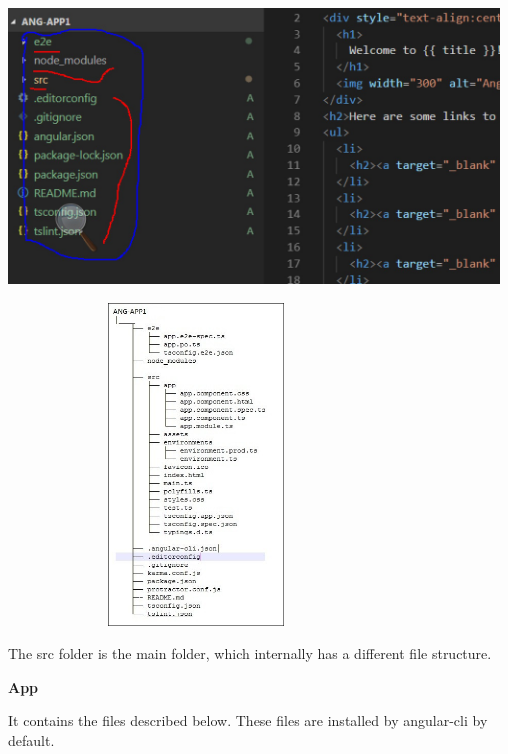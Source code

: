\documentclass{article}
\begin{document}
\begin{center}
	\noindent \includegraphics*[width=5.12in, height=2.88in]{IMG-01-34}
\end{center}
\begin{center}
	\noindent \includegraphics*[width=3.92in, height=3.36in]{IMG-01-35}
\end{center}


\noindent The src folder is the main folder, which internally has a different file structure.

\noindent \textbf{App}

\noindent It contains the files described below. These files are installed by angular-cli by default.
\end{document}
